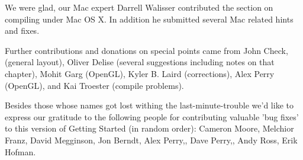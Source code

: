 We were glad, our Mac expert Darrell Walisser  contributed the section on compiling under Mac OS X. In addition he submitted several Mac related hints and fixes.

Further contributions and donations on special points came from John Check, (general layout), Oliver Delise  (several suggestions
including notes on that chapter), Mohit Garg  (OpenGL), Kyler B. Laird
 (corrections), Alex Perry (OpenGL), and Kai
Troester (compile problems).

Besides those whose names got lost withing the last-minute-trouble we'd like to express our
gratitude to the following people for contributing valuable 'bug fixes' to this version of Getting Started (in random order): Cameron Moore, Melchior Franz, David Megginson, Jon Berndt, Alex Perry,, Dave Perry,, Andy Ross, Erik Hofman. 

